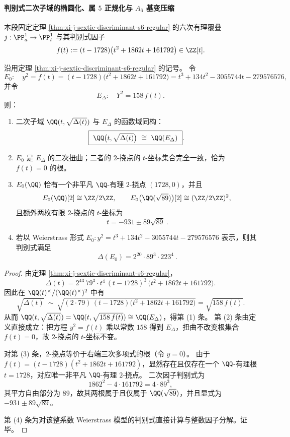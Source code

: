 \paragraph{判别式二次子域的椭圆化、属 \(5\) 正规化与 \(A_6\) 基变压缩}
本段固定定理 \ref{thm:xi-j-sextic-discriminant-s6-regular} 的六次有理覆叠 \(j:\PP^1_a\to\PP^1_t\) 与其判别式因子
\[
f(t):=(t-1728)\bigl(t^2+1862t+161792\bigr)\in\ZZ[t].
\]

\begin{theorem}\label{thm:xi-j-sextic-discriminant-quadratic-subfield-ellipticization}
沿用定理 \ref{thm:xi-j-sextic-discriminant-s6-regular} 的记号。
令
\[
E_0:\quad y^2=f(t)=(t-1728)\bigl(t^2+1862t+161792\bigr)
=t^3+134t^2-3055744t-279576576,
\]
并令
\[
E_\Delta:\quad Y^2=158\,f(t).
\]
则：
\begin{enumerate}
  \item 二次子域 \(\QQ(t,\sqrt{\Delta(t)})\) 与 \(E_\Delta\) 的函数域同构：
  \[
  \boxed{\ \QQ\bigl(t,\sqrt{\Delta(t)}\bigr)\ \cong\ \QQ(E_\Delta)\ }.
  \]
  \item \(E_0\) 是 \(E_\Delta\) 的二次扭曲；二者的 \(2\)-挠点的 \(t\)-坐标集合完全一致，恰为 \(f(t)=0\) 的根。
  \item \(E_0(\QQ)\) 恰有一个非平凡 \(\QQ\)-有理 \(2\)-挠点 \((1728,0)\)，并且
  \[
  E_0(\QQ)[2]\cong \ZZ/2\ZZ,\qquad
  E_0\bigl(\QQ(\sqrt{89})\bigr)[2]\cong (\ZZ/2\ZZ)^2,
  \]
  且额外两枚有限 \(2\)-挠点的 \(t\)-坐标为
  \[
  \boxed{\ t=-931\pm 89\sqrt{89}\ }.
  \]
  \item 若以 Weierstrass 形式 \(E_0:y^2=t^3+134t^2-3055744t-279576576\) 表示，则其判别式满足
  \[
  \boxed{\ \Delta(E_0)=2^{20}\cdot 89^{3}\cdot 223^{4}\ }.
  \]
\end{enumerate}
\end{theorem}
\begin{proof}
由定理 \ref{thm:xi-j-sextic-discriminant-s6-regular}，
\[
\Delta(t)=2^{43}\,79^3\cdot t^{4}\,(t-1728)^{3}\,\bigl(t^2+1862t+161792\bigr).
\]
因此在 \(\QQ(t)^\times/(\QQ(t)^\times)^2\) 中有
\[
\sqrt{\Delta(t)}\ \sim\ \sqrt{(2\cdot 79)\,(t-1728)\bigl(t^2+1862t+161792\bigr)}
=\sqrt{158\,f(t)}.
\]
从而 \(\QQ(t,\sqrt{\Delta(t)})=\QQ(t,\sqrt{158\,f(t)})\cong \QQ(E_\Delta)\)，得第 (1) 条。
第 (2) 条由定义直接成立：把方程 \(y^2=f(t)\) 乘以常数 \(158\) 得到 \(E_\Delta\)，扭曲不改变根集合 \(f(t)=0\)，故 \(2\)-挠点的 \(t\)-坐标不变。
\par
对第 (3) 条，\(2\)-挠点等价于右端三次多项式的根（令 \(y=0\)）。
由于 \(f(t)=(t-1728)(t^2+1862t+161792)\)，显然存在且仅存在一个 \(\QQ\)-有理根 \(t=1728\)，对应唯一非平凡 \(\QQ\)-有理 \(2\)-挠点。
二次因子判别式为
\[
1862^2-4\cdot 161792=4\cdot 89^3,
\]
其平方自由部分为 \(89\)，故其两根属于且仅属于 \(\QQ(\sqrt{89})\)，并且显式为 \(-931\pm 89\sqrt{89}\)。
\par
第 (4) 条为对该整系数 Weierstrass 模型的判别式直接计算与整数因子分解。证毕。
\end{proof}


